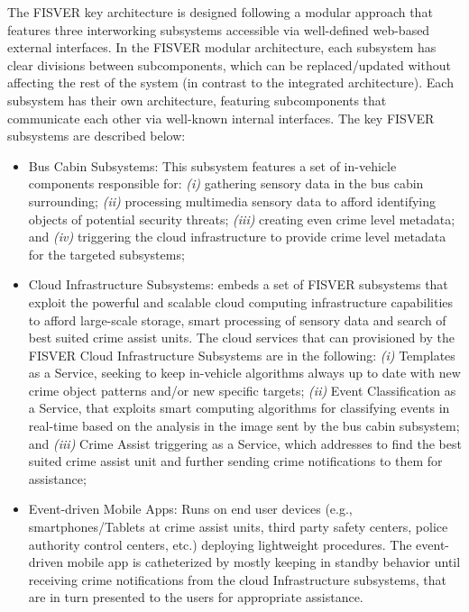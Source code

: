 The FISVER key architecture is designed following a modular approach that features three interworking subsystems accessible via well-defined web-based external interfaces. In the FISVER modular architecture, each subsystem has clear divisions between subcomponents, which can be replaced/updated without affecting the rest of the system (in contrast to the integrated architecture). Each subsystem has their own architecture, featuring subcomponents that communicate each other via well-known internal interfaces. The key FISVER subsystems are described below:

\begin{itemize}

\item Bus Cabin Subsystems: This subsystem features a set of in-vehicle components responsible for: \textit{(i)} gathering sensory data in the bus cabin surrounding; \textit{(ii)} processing multimedia sensory data to afford identifying objects of potential security threats; \textit{(iii)} creating even crime level metadata; and \textit{(iv)} triggering the cloud infrastructure to provide crime level metadata for the targeted subsystems;

\item Cloud Infrastructure Subsystems: embeds a set of FISVER subsystems that exploit the powerful and scalable cloud computing infrastructure capabilities to afford large-scale storage, smart processing of sensory data and search of best suited crime assist units. The cloud services that can provisioned by the FISVER Cloud Infrastructure Subsystems are in the following: \textit{(i)} Templates as a Service, seeking to keep in-vehicle algorithms always up to date with new crime object patterns and/or new specific targets; \textit{(ii)} Event Classification as a Service, that exploits smart computing algorithms for classifying events in real-time based on the analysis in the image sent by the bus cabin subsystem; and \textit{(iii)} Crime Assist triggering as a Service, which addresses to find the best suited crime assist unit and further sending crime notifications to them for assistance;

\item Event-driven Mobile Apps: Runs on end user devices (e.g., smartphones/Tablets at crime assist units, third party safety centers, police authority control centers, etc.) deploying lightweight procedures. The event-driven mobile app is catheterized by mostly keeping in standby behavior until receiving crime notifications from the cloud Infrastructure subsystems, that are in turn presented to the users for appropriate assistance.
\end{itemize}

